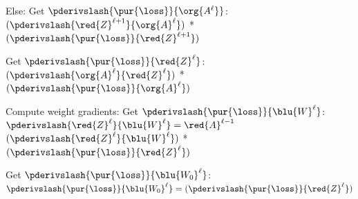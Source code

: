 \begin{codebox}
                                \li Else: 
                                    \Do
                                        \li Get $\pderivslash{ \pur{\loss} }{ \org{A^\ell} }$:
                                            \Do
                                                \li 
                                                $( \pderivslash{ \red{Z}^{\ell+1} }{ \org{A}^\ell } )$ 
                                                \;*\; 
                                                $( \pderivslash{ \pur{\loss} }{ \red{Z}^{\ell+1} } )$ 
                                            \End
                                            \li 
                                             
                                        \li Get $\pderivslash{ \pur{\loss} }{ \red{Z}^{\ell} }$:
                                            \Do
                                                \li
                                                $( \pderivslash{ \org{A}^\ell }{ \red{Z}^{\ell} } )$ 
                                                \;*\;
                                                $( \pderivslash{ \pur{\loss} }{ \org{A}^\ell } )$ 
                                            \End
                                            \li
                                    \End
                                    
                                    
                                \li Compute weight gradients:
                                    \Do
                                        \li Get $\pderivslash{ \pur{\loss} }{ \blu{W}^{\ell} }$:
                                            \Do
                                                \li $\pderivslash{\red{Z}^{\ell}}{ \blu{W}^\ell }
                                                = \red{A}^{\ell-1}$
                                                \li
                                                $( \pderivslash{\red{Z}^{\ell}}{ \blu{W}^\ell } )$ 
                                                \;*\;
                                                $( \pderivslash{ \pur{\loss} }{ \red{Z}^{\ell}} )$ 
                                            \End
                                            \li
                                        
                                        \li Get $\pderivslash{ \pur{\loss} }{ \blu{W_0}^{\ell} }$:
                                            \Do
                                                \li
                                                $\pderivslash{ \pur{\loss} }{ \blu{W_0}^{\ell} }
                                                =
                                                ( \pderivslash{ \pur{\loss} }{ \red{Z}^{\ell}} )$ 
                                            \End
                                            \li
                                    \End
                                    

\end{codebox}
